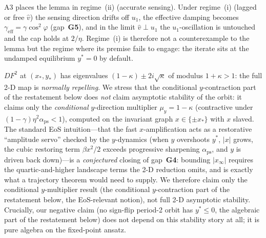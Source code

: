 \begin{remark}
\label{rem:regime-i}
A3 places the lemma in regime~(ii) (accurate sensing). Under regime~(i)
(lagged or free $\hat v$) the sensing direction drifts off $u_{1}$, the
effective damping becomes $\gamma_{\mathrm{eff}}=\gamma\cos^{2}\varphi$
(gap~\textbf{G5}), and in the limit $\hat v\perp u_{1}$ the $u_{1}$-oscillation
is untouched and the cap holds at $2/\eta$. Regime~(i) is therefore not a
counterexample to the lemma but the regime where its premise fails to
engage: the iterate sits at the undamped equilibrium $y^{*}=0$ by default.
\end{remark}

\begin{remark}
\label{rem:jacobian}
$DF^{2}$ at $(x_{*},y_{*})$ has eigenvalues $(1-\kappa)\pm 2i\sqrt{\kappa}$ of
modulus $1+\kappa>1$: the full 2-D map is \emph{normally repelling}. We stress
that the conditional $y$-contraction part of the restatement below does \emph{not} claim
asymptotic stability of the orbit: it claims only the \emph{conditional}
$y$-direction multiplier $\mu_{y}=1-\kappa$ (contractive under
$(1-\gamma)\eta^{2}\alpha_{\mathrm{ps}}<1$), computed on the invariant graph
$x\in\{\pm x_{*}\}$ with $x$ slaved. The standard EoS intuition---that the fast
$x$-amplification acts as a restorative ``amplitude servo'' checked by the
$y$-dynamics (when $y$ overshoots $y^{*}$, $|x|$ grows, the cubic restoring term
$\beta x^{2}/2$ exceeds progressive sharpening $\alpha_{\mathrm{ps}}$, and $y$ is driven back
down)---is a \emph{conjectured} closing of gap~\textbf{G4}: bounding
$|x_{\infty}|$ requires the quartic-and-higher landscape terms the 2-D reduction
omits, and is exactly what a trajectory theorem would need to supply. We
therefore claim only the conditional $y$-multiplier result
(the conditional $y$-contraction part of the restatement below, the EoS-relevant notion), not
full 2-D asymptotic stability. Crucially, our negative claim (no sign-flip
period-2 orbit has $y^{*}\le0$, the algebraic part of the restatement
below) does not depend on this stability
story at all; it is pure algebra on the fixed-point ansatz.
\end{remark}

